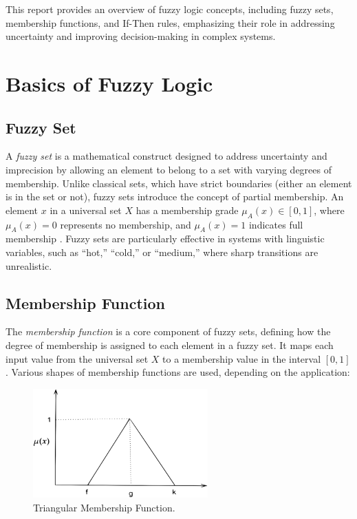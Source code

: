 \documentclass[a4paper,12pt]{report}
\begin{document}
This report provides an overview of fuzzy logic concepts, including fuzzy sets, membership functions, and If-Then rules, emphasizing their role in addressing uncertainty and improving decision-making in complex systems.


\chapter{Basics of Fuzzy Logic}
\section{Fuzzy Set}

A \textit{fuzzy set} is a mathematical construct designed to address uncertainty and imprecision by allowing an element to belong to a set with varying degrees of membership. Unlike classical sets, which have strict boundaries (either an element is in the set or not), fuzzy sets introduce the concept of partial membership. An element \(x\) in a universal set \(X\) has a membership grade \( \mu_A(x) \in [0, 1] \), where \( \mu_A(x) = 0 \) represents no membership, and \( \mu_A(x) = 1 \) indicates full membership \cite{zadeh1965fuzzy}. Fuzzy sets are particularly effective in systems with linguistic variables, such as ``hot,'' ``cold,'' or ``medium,'' where sharp transitions are unrealistic.

\section{Membership Function}

The \textit{membership function} is a core component of fuzzy sets, defining how the degree of membership is assigned to each element in a fuzzy set. It maps each input value from the universal set \(X\) to a membership value in the interval \([0, 1]\) . Various shapes of membership functions are used, depending on the application:

\begin{figure}[H]
    \centering
    \includegraphics[width=0.6\textwidth]{tmf.png}
    \caption{Triangular Membership Function.}
    \label{fig:triangular}
\end{figure}
\end{document}
